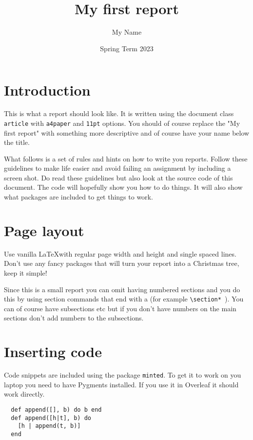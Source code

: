 \documentclass[a4paper,11pt]{article}
\begin{document}
\title{
    \textbf{My first report}
}
\author{My Name}
\date{Spring Term 2023}

\maketitle

\section*{Introduction}

This is what a report should look like. It is written using the
document class {\tt article} with {\tt a4paper} and {\tt 11pt}
options.  You should of course replace the "My first report" with
something more descriptive and of course have your name below the
title.

What follows is a set of rules and hints on how to write you
reports. Follow these guidelines to make life easier and avoid failing
an assignment by including a screen shot. Do read these guidelines but
also look at the source code of this document. The code will hopefully
show you how to do things. It will also show what packages are
included to get things to work.

\section*{Page layout}

Use vanilla \LaTeX with regular page width and height and single
spaced lines. Don't use any fancy packages that will turn your report
into a Christmas tree, keep it simple!

Since this is a small report you can omit having numbered sections and
you do this by using section commands that end with a {\tt *} (for
example {\tt \textbackslash section* }). You can of course have
subsections etc but if you don't have numbers on the main sections
don't add numbers to the subsections.

\section*{Inserting code}

Code snippets are included using the package {\tt minted}. To get it
to work on you laptop you need to have Pygments installed. If you use
it in Overleaf it should work directly.

\begin{verbatim}
  def append([], b) do b end
  def append([h|t], b) do
    [h | append(t, b)]
  end  
\end{verbatim}
\end{document}
